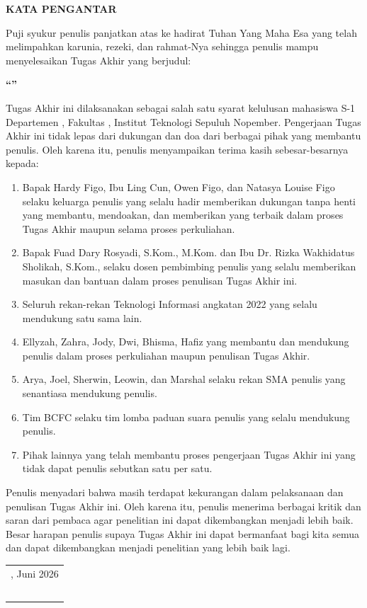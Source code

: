 \begin{center}
  \Large
  \textbf{KATA PENGANTAR}
\end{center}


\vspace{2ex}

Puji syukur penulis panjatkan atas ke hadirat Tuhan Yang Maha Esa yang telah melimpahkan karunia, rezeki, dan rahmat-Nya sehingga penulis mampu menyelesaikan Tugas Akhir yang berjudul:
\begin{center}
  \textbf{“\tatitle{}”}
\end{center}

Tugas Akhir ini dilaksanakan sebagai salah satu syarat kelulusan mahasiswa S-1 Departemen \department{}, Fakultas \faculty{}, Institut Teknologi Sepuluh Nopember. Pengerjaan Tugas Akhir ini tidak lepas dari dukungan dan doa dari berbagai pihak yang membantu penulis. Oleh karena itu, penulis menyampaikan terima kasih sebesar-besarnya kepada:

\begin{enumerate}
  \item Bapak Hardy Figo, Ibu Ling Cun, Owen Figo, dan Natasya Louise Figo selaku keluarga penulis yang selalu hadir memberikan dukungan tanpa henti yang membantu, mendoakan, dan memberikan yang terbaik dalam proses Tugas Akhir maupun selama proses perkuliahan.
  \item Bapak Fuad Dary Rosyadi, S.Kom., M.Kom. dan Ibu Dr. Rizka Wakhidatus Sholikah, S.Kom., selaku dosen pembimbing penulis yang selalu memberikan masukan dan bantuan dalam proses penulisan Tugas Akhir ini.
  \item Seluruh rekan-rekan Teknologi Informasi angkatan 2022 yang selalu mendukung satu sama lain.
  \item Ellyzah, Zahra, Jody, Dwi, Bhisma, Hafiz yang membantu dan mendukung penulis dalam proses perkuliahan maupun penulisan Tugas Akhir.
  \item Arya, Joel, Sherwin, Leowin, dan Marshal selaku rekan SMA penulis yang senantiasa mendukung penulis.
  \item Tim BCFC selaku tim lomba paduan suara penulis yang selalu mendukung penulis.
  \item Pihak lainnya yang telah membantu proses pengerjaan Tugas Akhir ini yang tidak dapat penulis sebutkan satu per satu.
\end{enumerate}

Penulis menyadari bahwa masih terdapat kekurangan dalam pelaksanaan dan penulisan Tugas Akhir ini. Oleh karena itu, penulis menerima berbagai kritik dan saran dari pembaca agar penelitian ini dapat dikembangkan menjadi lebih baik. Besar harapan penulis supaya Tugas Akhir ini dapat bermanfaat bagi kita semua dan dapat dikembangkan menjadi penelitian yang lebih baik lagi.

\begin{flushright}
  \begin{tabular}[b]{c}
    \place{}, Juni 2026 \\
    \\
    \\
    \\
    \\
    \name{}
  \end{tabular}
\end{flushright}
